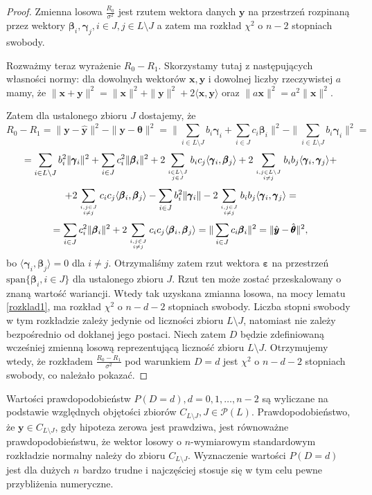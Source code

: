 \documentclass[12pt]{mwart}
\begin{document}
\begin{proof}
Zmienna losowa $\frac{R_0}{\sigma^2}$ jest rzutem wektora danych $\pmb{y}$ na przestrzeń rozpinaną przez wektory $\pmb{\beta}_i,\pmb{\gamma}_j,i\in J,j\in L\setminus J$ a zatem ma rozkład $\chi^2$ o $n-2$ stopniach swobody. 

Rozważmy teraz wyrażenie $R_0-R_1$. Skorzystamy tutaj z następujących własności normy: dla dowolnych wektorów $\pmb{x},\pmb{y}$ i dowolnej liczby rzeczywistej $a$ mamy, że $\|\pmb{x}+\pmb{y}\|^2=\|\pmb{x}\|^2+\|\pmb{y}\|^2+2\langle \pmb{x},\pmb{y}\rangle$ oraz $\|a\pmb{x}\|^2=a^2\|\pmb{x}\|^2$.

Zatem dla ustalonego zbioru $J$ dostajemy, że 
$$
R_0-R_1=\|\pmb{y}-\hat{\pmb{y}}\|^2-\|\pmb{y}-\hat{\pmb{\theta}}\|^2=\|\sum_{i\in L\setminus J}b_i\pmb{\gamma}_i+\sum_{i\in J}c_i\pmb{\beta}_i\|^2-\|\sum_{i\in L\setminus J}b_i\pmb{\gamma}_i\|^2=$$ $$=\sum_{i\in L\setminus J}b_i^2\|\pmb{\gamma}_i\|^2+\sum_{i\in J}c_i^2\|\pmb{\beta}_i\|^2+2\sum_{{i\in L\setminus J}\atop {j\in J}}b_ic_j\langle \pmb{\gamma}_i,\pmb{\beta}_j\rangle+2\sum_{{i,j\in L\setminus J}\atop {i\neq j}}b_ib_j\langle \pmb{\gamma}_i,\pmb{\gamma}_j\rangle +$$ $$+2\sum_{{i,j\in J}\atop {i\neq j}}c_ic_j\langle \pmb{\beta}_i,\pmb{\beta}_j\rangle -\sum_{i\in J}b_i^2\|\pmb{\gamma}_i\|-2\sum_{{i,j\in J}\atop {i\neq j}}b_ib_j\langle \pmb{\gamma}_i,\pmb{\gamma}_j\rangle=$$ $$= \sum_{i\in J}c_i^2\|\pmb{\beta}_i\|^2+2\sum_{{i,j\in J}\atop {i\neq j}}c_ic_j\langle \pmb{\beta}_i,\pmb{\beta}_j\rangle=\|\sum_{i\in J}c_i\pmb{\beta}_i\|^2=\|\hat{\pmb{y}}-\hat{\pmb{\theta}}\|^2,
$$
 bo $\langle \pmb{\gamma}_i,\pmb{\beta}_j\rangle =0$ dla $i\neq j$. Otrzymaliśmy zatem rzut wektora $\pmb{\varepsilon}$ na przestrzeń $\textrm{span}\{\pmb{\beta}_i,i\in J\}$ dla ustalonego zbioru $J$. Rzut ten może zostać przeskalowany o znaną wartość wariancji. Wtedy tak uzyskana zmianna losowa, na mocy lematu \ref{rozklad1}, ma rozkład $\chi^2$ o $n-d-2$ stopniach swobody. Liczba stopni swobody w tym rozkładzie zależy jedynie od liczności zbioru $L\setminus J$, natomiast nie zależy bezpośrednio od dokłanej jego postaci. Niech zatem $D$ będzie zdefiniowaną wcześniej zmienną losową reprezentującą liczność zbioru $L\setminus J$. Otrzymujemy wtedy, że rozkładem $\frac{R_0-R_1}{\sigma^2}$ pod warunkiem $D=d$ jest $\chi^2$ o $n-d-2$ stopniach swobody, co należało pokazać.
\end{proof}
Wartości prawdopodobieństw $P(D=d), d=0,1,\dots, n-2$ są wyliczane na podstawie względnych objętości zbiorów $C_{L\setminus J},J\in \mathcal{P}(L)$. Prawdopodobieństwo, że $\pmb{y}\in C_{L\setminus J}$, gdy hipoteza zerowa jest prawdziwa, jest równoważne prawdopodobieństwu, że wektor losowy o $n$-wymiarowym standardowym rozkładzie normalny należy do zbioru $C_{L\setminus J}$. Wyznaczenie wartości $P(D=d)$ jest dla dużych $n$ bardzo trudne i najczęściej stosuje się w tym celu pewne przybliżenia numeryczne.
\end{document}
